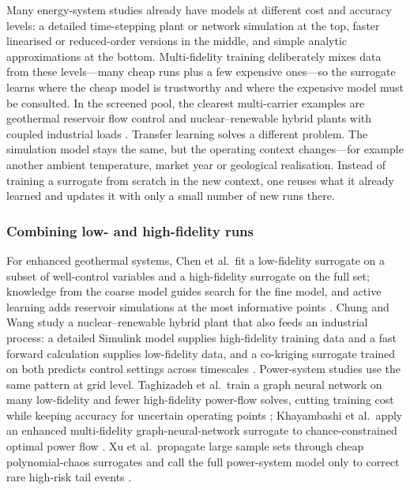 Many energy-system studies already have models at different cost and
accuracy levels: a detailed time-stepping plant or network simulation
at the top, faster linearised or reduced-order versions in the middle,
and simple analytic approximations at the bottom. Multi-fidelity
training deliberately mixes data from these levels---many cheap runs
plus a few expensive ones---so the surrogate learns where the cheap
model is trustworthy and where the expensive model must be consulted.
In the screened pool, the clearest multi-carrier examples are geothermal
reservoir flow control and nuclear--renewable hybrid plants with coupled
industrial loads \cite{Chen2025244,Chung2023}. Transfer learning solves
a different problem. The simulation model stays the same, but the
operating context changes---for example another ambient temperature,
market year or geological realisation. Instead of training a surrogate
from scratch in the new context, one reuses what it already learned and
updates it with only a small number of new runs there.

\subsubsection{Combining low- and high-fidelity runs}
\label{sec:doe:mf_combine}

For enhanced geothermal systems, Chen et al.\ fit a low-fidelity
surrogate on a subset of well-control variables and a high-fidelity
surrogate on the full set; knowledge from the coarse model guides search
for the fine model, and active learning adds reservoir simulations at the
most informative points \cite{Chen2025244}. Chung and Wang study
a nuclear--renewable hybrid plant that also feeds an industrial process:
a detailed Simulink model supplies high-fidelity training data and a
fast forward calculation supplies low-fidelity data, and a co-kriging
surrogate trained on both predicts control settings across timescales
\cite{Chung2023}. Power-system studies use the same pattern at grid
level. Taghizadeh et al.\ train a graph neural network on many
low-fidelity and fewer high-fidelity power-flow solves, cutting training
cost while keeping accuracy for uncertain operating points
\cite{Taghizadeh2024}; Khayambashi et al.\ apply an enhanced
multi-fidelity graph-neural-network surrogate to chance-constrained optimal
power flow \cite{Khayambashi202453}. Xu et al.\ propagate large
sample sets through cheap polynomial-chaos surrogates and call the full
power-system model only to correct rare high-risk tail events
\cite{Xu20203127}.

